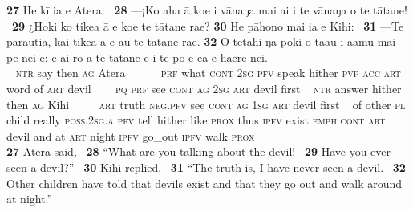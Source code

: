 \bigskip\gll
\textbf{\textup{27}} He kī ia e {\ꞌ}Atera: ~\textbf{\textup{28}} —¡Ko aha {\ꞌ}ā koe i vānaŋa mai ai i te vānaŋa o te tātane! ~\textbf{\textup{29}} ¿Hoki ko tike{\ꞌ}a {\ꞌ}ā e koe te tātane ra{\ꞌ}e? \textbf{\textup{30}} He pāhono mai ia e Kihi: ~\textbf{\textup{31}} —Te parauti{\ꞌ}a, kai tike{\ꞌ}a {\ꞌ}ā e au te tātane ra{\ꞌ}e. \textbf{\textup{32}} O tētahi ŋā poki {\ꞌ}ō tā{\ꞌ}au i {\ꞌ}a{\ꞌ}amu mai pē nei ē: e ai rō {\ꞌ}ā te tātane {\ꞌ}e {\ꞌ}i te pō e e{\ꞌ}a e ha{\ꞌ}ere nei.\\
~ \textsc{ntr} say then \textsc{ag} Atera ~ ~~~~\textsc{prf} what \textsc{cont} \textsc{2sg} \textsc{pfv} speak hither \textsc{pvp} \textsc{acc} \textsc{art} word of \textsc{art} devil ~ ~~\textsc{pq} \textsc{prf} see \textsc{cont} \textsc{ag} \textsc{2sg} \textsc{art} devil first  ~ \textsc{ntr} answer hither then \textsc{ag} Kihi ~ ~~~\textsc{art} truth \textsc{neg.pfv} see \textsc{cont} \textsc{ag} \textsc{1sg} \textsc{art} devil first ~ of other \textsc{pl} child really \textsc{poss.2sg.a} \textsc{pfv} tell hither like \textsc{prox} thus \textsc{ipfv} exist \textsc{emph} \textsc{cont} \textsc{art} devil and at \textsc{art} night \textsc{ipfv} go\_out \textsc{ipfv} walk \textsc{prox}\\

\medskip\glt
\textbf{\textup{27}} Atera said, ~\textbf{\textup{28}} “What are you talking about the devil! ~\textbf{\textup{29}} Have you ever seen a devil?” ~\textbf{\textup{30}} Kihi replied, ~\textbf{\textup{31}} “The truth is, I have never seen a devil. ~\textbf{\textup{32}} Other children have told that devils exist and that they go out and walk around at night.”

~

